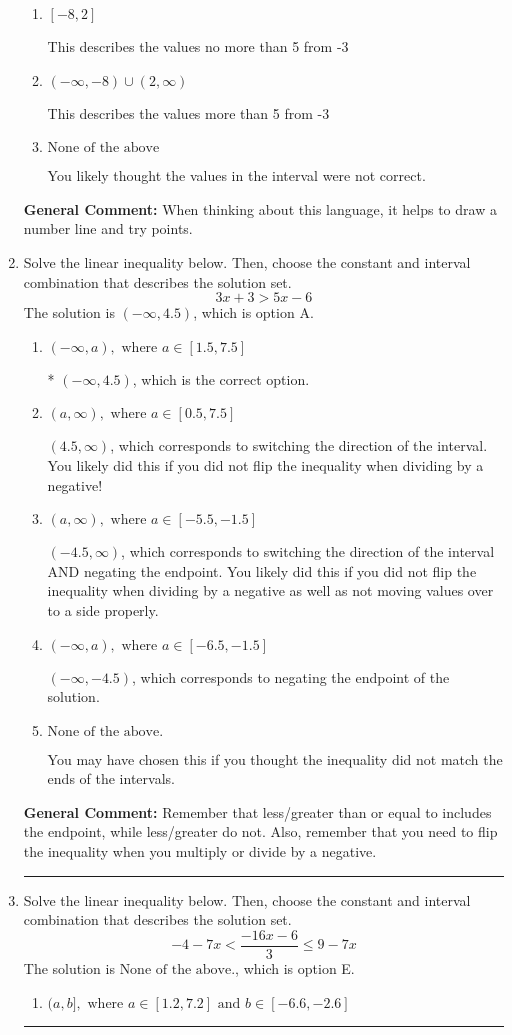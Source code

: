 \documentclass{extbook}[14pt]
\newcommand{\litem}[1]{\item #1

\rule{\textwidth}{0.4pt}}
\begin{document}
\begin{enumerate}
{\begin{enumerate}[label=\Alph*.]
This describes the values less than 5 from -3
\item \( [-8, 2] \)

This describes the values no more than 5 from -3
\item \( (-\infty, -8) \cup (2, \infty) \)

This describes the values more than 5 from -3
\item \( \text{None of the above} \)

You likely thought the values in the interval were not correct.
\end{enumerate}

\textbf{General Comment:} When thinking about this language, it helps to draw a number line and try points.
}
\litem{
Solve the linear inequality below. Then, choose the constant and interval combination that describes the solution set.
\[ 3x + 3 > 5x -6 \]The solution is \( (-\infty, 4.5) \), which is option A.\begin{enumerate}[label=\Alph*.]
\item \( (-\infty, a), \text{ where } a \in [1.5, 7.5] \)

* $(-\infty, 4.5)$, which is the correct option.
\item \( (a, \infty), \text{ where } a \in [0.5, 7.5] \)

 $(4.5, \infty)$, which corresponds to switching the direction of the interval. You likely did this if you did not flip the inequality when dividing by a negative!
\item \( (a, \infty), \text{ where } a \in [-5.5, -1.5] \)

 $(-4.5, \infty)$, which corresponds to switching the direction of the interval AND negating the endpoint. You likely did this if you did not flip the inequality when dividing by a negative as well as not moving values over to a side properly.
\item \( (-\infty, a), \text{ where } a \in [-6.5, -1.5] \)

 $(-\infty, -4.5)$, which corresponds to negating the endpoint of the solution.
\item \( \text{None of the above}. \)

You may have chosen this if you thought the inequality did not match the ends of the intervals.
\end{enumerate}

\textbf{General Comment:} Remember that less/greater than or equal to includes the endpoint, while less/greater do not. Also, remember that you need to flip the inequality when you multiply or divide by a negative.
}
\litem{
Solve the linear inequality below. Then, choose the constant and interval combination that describes the solution set.
\[ -4 - 7 x < \frac{-16 x - 6}{3} \leq 9 - 7 x \]The solution is \( \text{None of the above.} \), which is option E.\begin{enumerate}[label=\Alph*.]
\item \( (a, b], \text{ where } a \in [1.2, 7.2] \text{ and } b \in [-6.6, -2.6] \)


\end{enumerate}}
\end{enumerate}
\end{document}
